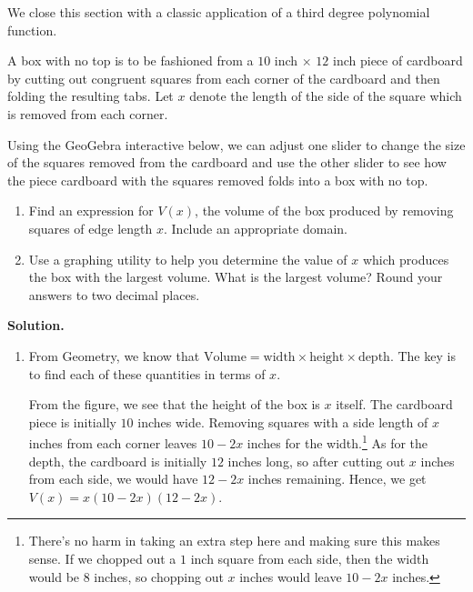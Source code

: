 \documentclass{ximera}
\begin{document}
We close this section with a classic application of a third degree polynomial function.

\begin{example}  \label{boxnotopex} A box with no top is to be fashioned from a $10$ inch $\times$ $12$ inch piece of cardboard by cutting out congruent squares from each corner of the cardboard and then folding the resulting tabs.  Let $x$ denote the length of the side of the square which is removed from each corner.

Using the GeoGebra interactive below, we can adjust one slider to change the size of the squares removed from the cardboard and use the other slider to see how the piece cardboard with the squares removed folds into a box with no top.


\begin{center}
\end{center}

\begin{enumerate}

\item  Find an expression for $V(x)$, the volume of the box produced by removing squares of edge length $x$. Include an appropriate domain.

\item  Use a graphing utility to help you determine the value of $x$ which produces the box with the largest volume.  What is the largest volume?  Round your answers to two decimal places.

\end{enumerate}

{\bf Solution.} 

\begin{enumerate}

\item  From Geometry, we know that $\text{Volume} = \text{width} \times \text{height} \times \text{depth}$.  The key is to find each of these quantities in terms of $x$.  


From the figure, we see that the height of the box is $x$ itself.  The cardboard piece is initially $10$ inches wide.  Removing squares with a side length of $x$ inches from each corner leaves $10-2x$ inches for the width.\footnote{There's no harm in taking an extra step here and making sure this makes sense.  If we chopped out a $1$ inch square from each side, then the width would be $8$ inches, so chopping out $x$ inches would leave $10-2x$ inches.}   As for the depth, the cardboard is initially $12$ inches long, so after cutting out $x$ inches from each side, we would have $12-2x$ inches remaining. Hence, we get $V(x) = x(10-2x)(12-2x)$.  


\end{enumerate}
\end{example}
\end{document}
